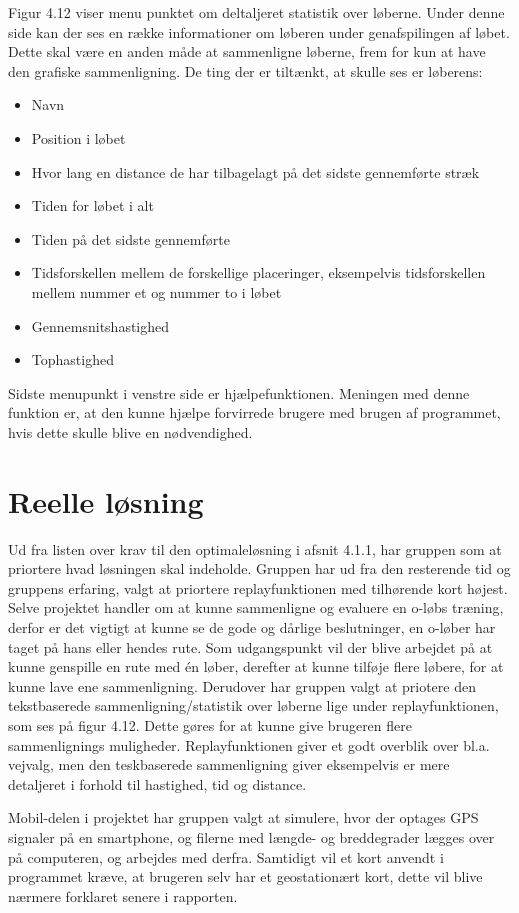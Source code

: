 Figur 4.12 viser menu punktet om deltaljeret statistik over løberne. Under denne side kan der ses en række informationer om løberen under genafspilingen af løbet. Dette skal være en anden måde at sammenligne løberne, frem for kun at have den grafiske sammenligning. De ting der er tiltænkt, at skulle ses er løberens:
\begin{itemize}
\item Navn
\item Position i løbet
\item Hvor lang en distance de har tilbagelagt på det sidste gennemførte stræk
\item Tiden for løbet i alt
\item Tiden på det sidste gennemførte
\item Tidsforskellen mellem de forskellige placeringer, eksempelvis tidsforskellen mellem nummer et og nummer to i løbet
\item Gennemsnitshastighed
\item Tophastighed
\end{itemize}

Sidste menupunkt i venstre side er hjælpefunktionen. Meningen med denne funktion er, at den kunne hjælpe forvirrede brugere med brugen af programmet, hvis dette skulle blive en nødvendighed.

\section{Reelle løsning}
Ud fra listen over krav til den optimaleløsning i afsnit 4.1.1, har gruppen som at priortere hvad løsningen skal indeholde. Gruppen har ud fra den resterende tid og gruppens erfaring, valgt at priortere replayfunktionen med tilhørende kort højest. Selve projektet handler om at kunne sammenligne og evaluere en o-løbs træning, derfor er det vigtigt at kunne se de gode og dårlige beslutninger, en o-løber har taget på hans eller hendes rute. Som udgangspunkt vil der blive arbejdet på at kunne genspille en rute med én løber, derefter at kunne tilføje flere løbere, for at kunne lave ene sammenligning. Derudover har gruppen valgt at priotere den tekstbaserede sammenligning/statistik over løberne lige under replayfunktionen, som ses på figur 4.12. Dette gøres for at kunne give brugeren flere sammenlignings muligheder. Replayfunktionen giver et godt overblik over bl.a. vejvalg, men den teskbaserede sammenligning giver eksempelvis er mere detaljeret i forhold til hastighed, tid og distance.

Mobil-delen i projektet har gruppen valgt at simulere, hvor der optages GPS signaler på en smartphone, og filerne med længde- og breddegrader lægges over på computeren, og arbejdes med derfra. Samtidigt vil et kort anvendt i programmet kræve, at brugeren selv har et geostationært kort, dette vil blive nærmere forklaret senere i rapporten.

